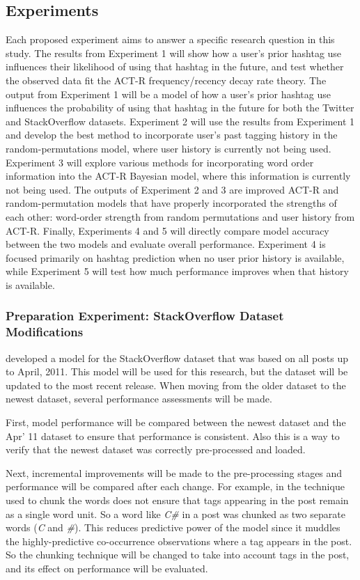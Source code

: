 \documentclass[man,floatsintext]{apa6}
\begin{document}
\subsection{Experiments}

Each proposed experiment aims to answer a specific research question in this study.
The results from Experiment 1 will show how a user's prior hashtag use influences their likelihood of using that hashtag in the future, and test whether the observed data fit the ACT-R frequency/recency decay rate theory.
The output from Experiment 1 will be a model of how a user's prior hashtag use influences the probability of using that hashtag in the future for both the Twitter and StackOverflow datasets.
Experiment 2 will use the results from Experiment 1 and develop the best method to incorporate user's past tagging history in the random-permutations model, where user history is currently not being used.
Experiment 3 will explore various methods for incorporating word order information into the ACT-R Bayesian model, where this information is currently not being used.
The outputs of Experiment 2 and 3 are improved ACT-R and random-permutation models that have properly incorporated the strengths of each other: word-order strength from random permutations and user history from ACT-R.
Finally, Experiments 4 and 5 will directly compare model accuracy between the two models and evaluate overall performance.
Experiment 4 is focused primarily on hashtag prediction when no user prior history is available, while Experiment 5 will test how much performance improves when that history is available.

\subsubsection{Preparation Experiment: StackOverflow Dataset Modifications}

\textcite{Stanley2013} developed a model for the StackOverflow dataset that was based on all posts up to April, 2011.
This model will be used for this research, but the dataset will be updated to the most recent release.
When moving from the older dataset to the newest dataset, several performance assessments will be made.

First, model performance will be compared between the newest dataset and the Apr' 11 dataset to ensure that performance is consistent.
Also this is a way to verify that the newest dataset was correctly pre-processed and loaded.

Next, incremental improvements will be made to the pre-processing stages and performance will be compared after each change.
For example, in \textcite{Stanley2013} the technique used to chunk the words does not ensure that tags appearing in the post remain as a single word unit.
So a word like \emph{C\#} in a post was chunked as two separate words (\emph{C} and \emph{\#}).
This reduces predictive power of the model since it muddles the highly-predictive co-occurrence observations where a tag appears in the post.
So the chunking technique will be changed to take into account tags in the post, and its effect on performance will be evaluated.
\end{document}
